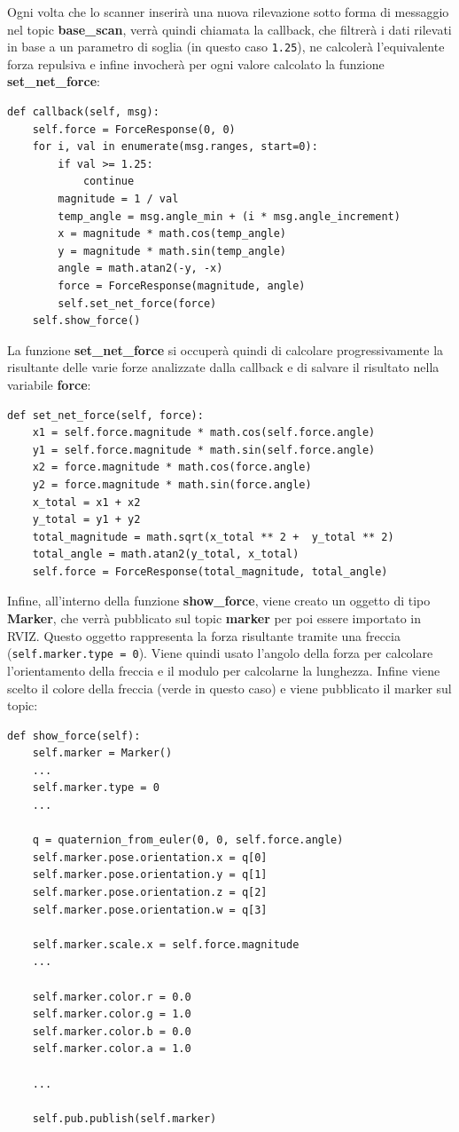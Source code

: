 \documentclass[Lau, binding=0.6cm, oneside]{sapthesis}
\begin{document}
Ogni volta che lo scanner inserirà una nuova rilevazione sotto forma di messaggio nel topic \textbf{base\_scan}, verrà quindi chiamata la callback, che filtrerà i dati rilevati in base a un parametro di soglia (in questo caso \lstinline{1.25}), ne calcolerà l'equivalente forza repulsiva e infine invocherà per ogni valore calcolato la funzione \textbf{set\_net\_force}:

\begin{lstlisting}
def callback(self, msg):
    self.force = ForceResponse(0, 0)
    for i, val in enumerate(msg.ranges, start=0):
        if val >= 1.25:
            continue
        magnitude = 1 / val
        temp_angle = msg.angle_min + (i * msg.angle_increment)
        x = magnitude * math.cos(temp_angle)
        y = magnitude * math.sin(temp_angle)
        angle = math.atan2(-y, -x)
        force = ForceResponse(magnitude, angle)
        self.set_net_force(force)
    self.show_force()
\end{lstlisting}

La funzione \textbf{set\_net\_force} si occuperà quindi di calcolare progressivamente la risultante delle varie forze analizzate dalla callback e di salvare il risultato nella variabile \textbf{force}:

\begin{lstlisting}
def set_net_force(self, force):
    x1 = self.force.magnitude * math.cos(self.force.angle)
    y1 = self.force.magnitude * math.sin(self.force.angle)
    x2 = force.magnitude * math.cos(force.angle)
    y2 = force.magnitude * math.sin(force.angle)
    x_total = x1 + x2
    y_total = y1 + y2
    total_magnitude = math.sqrt(x_total ** 2 +  y_total ** 2)
    total_angle = math.atan2(y_total, x_total)
    self.force = ForceResponse(total_magnitude, total_angle)
\end{lstlisting}

Infine, all'interno della funzione \textbf{show\_force}, viene creato un oggetto di tipo \textbf{Marker}, che verrà pubblicato sul topic \textbf{marker} per poi essere importato in RVIZ.
Questo oggetto rappresenta la forza risultante tramite una freccia (\lstinline{self.marker.type = 0}).
Viene quindi usato l'angolo della forza per calcolare l'orientamento della freccia e il modulo per calcolarne la lunghezza.
Infine viene scelto il colore della freccia (verde in questo caso) e viene pubblicato il marker sul topic:

\begin{lstlisting}
def show_force(self):
    self.marker = Marker()
    ...
    self.marker.type = 0
    ...

    q = quaternion_from_euler(0, 0, self.force.angle)
    self.marker.pose.orientation.x = q[0]
    self.marker.pose.orientation.y = q[1]
    self.marker.pose.orientation.z = q[2]
    self.marker.pose.orientation.w = q[3]

    self.marker.scale.x = self.force.magnitude
    ...

    self.marker.color.r = 0.0
    self.marker.color.g = 1.0
    self.marker.color.b = 0.0
    self.marker.color.a = 1.0

    ...

    self.pub.publish(self.marker)
\end{lstlisting}
\end{document}
